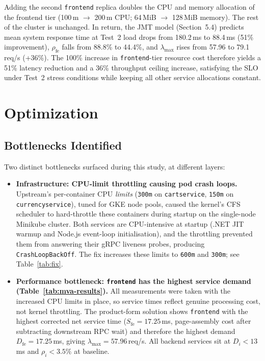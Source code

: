 \documentclass[12pt]{article}
\begin{document}
Adding the second \texttt{frontend} replica doubles the CPU and memory allocation of the frontend tier (100\,m $\to$ 200\,m CPU; 64\,MiB $\to$ 128\,MiB memory). The rest of the cluster is unchanged. In return, the JMT model (Section~5.4) predicts mean system response time at Test~2 load drops from 180.2\,ms to 88.4\,ms (51\% improvement), $\rho_{\text{fe}}$ falls from 88.8\% to 44.4\%, and $\lambda_{\max}$ rises from 57.96 to 79.1\,req/s (+36\%). The 100\% increase in \texttt{frontend}-tier resource cost therefore yields a 51\% latency reduction and a 36\% throughput ceiling increase, satisfying the SLO under Test~2 stress conditions while keeping all other service allocations constant.

\section{Optimization}

\subsection{Bottlenecks Identified}

Two distinct bottlenecks surfaced during this study, at different layers:

\begin{itemize}
  \item \textbf{Infrastructure: CPU-limit throttling causing pod crash loops.} Upstream's per-container CPU \emph{limits} (\texttt{300m} on \texttt{cartservice}, \texttt{150m} on \texttt{currencyservice}), tuned for GKE node pools, caused the kernel's CFS scheduler to hard-throttle these containers during startup on the single-node Minikube cluster. Both services are CPU-intensive at startup (.NET JIT warmup and Node.js event-loop initialisation), and the throttling prevented them from answering their gRPC liveness probes, producing \texttt{CrashLoopBackOff}. The fix increases these limits to \texttt{600m} and \texttt{300m}; see Table~\ref{tab:fix}.
  \item \textbf{Performance bottleneck: \texttt{frontend} has the highest service demand (Table~\ref{tab:mva-results}).} All measurements were taken with the increased CPU limits in place, so service times reflect genuine processing cost, not kernel throttling. The product-form solution shows \texttt{frontend} with the highest corrected net service time ($S_{\text{fe}}=17.25$\,ms, page-assembly cost after subtracting downstream RPC wait) and therefore the highest demand $D_{\text{fe}}=17.25$\,ms, giving $\lambda_{\max}=57.96$\,req/s. All backend services sit at $D_i < 13$\,ms and $\rho_i < 3.5\%$ at baseline.
\end{itemize}
\end{document}
